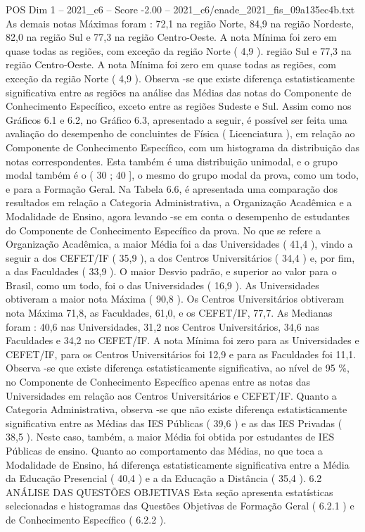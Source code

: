 \begin{textsample}{POS Dim 1 – 2021\_c6 – Score -2.00 – 2021\_c6/enade\_2021\_fis\_09a135ec4b.txt}
As demais notas Máximas foram : 72,1 na região Norte, 84,9 na região Nordeste, 82,0 na região Sul e 77,3 na região Centro-Oeste.
A nota Mínima foi zero em quase todas as regiões, com exceção da região Norte ( 4,9 ). região Sul e 77,3 na região Centro-Oeste.
A nota Mínima foi zero em quase todas as regiões, com exceção da região Norte ( 4,9 ).
Observa -se que existe diferença estatisticamente significativa entre as regiões na análise das Médias das notas do Componente de Conhecimento Específico, exceto entre as regiões Sudeste e Sul.
Assim como nos Gráficos 6.1 e 6.2, no Gráfico 6.3, apresentado a seguir, é possível ser feita uma avaliação do desempenho de concluintes de Física ( Licenciatura ), em relação ao Componente de Conhecimento Específico, com um histograma da distribuição das notas correspondentes.
Esta também é uma distribuição unimodal, e o grupo modal também é o ( 30 ; 40 ], o mesmo do grupo modal da prova, como um todo, e para a Formação Geral.
Na Tabela 6.6, é apresentada uma comparação dos resultados em relação a Categoria Administrativa, a Organização Acadêmica e a Modalidade de Ensino, agora levando -se em conta o desempenho de estudantes do Componente de Conhecimento Específico da prova.
No que se refere a Organização Acadêmica, a maior Média foi a das Universidades ( 41,4 ), vindo a seguir a dos CEFET/IF ( 35,9 ), a dos Centros Universitários ( 34,4 ) e, por fim, a das Faculdades ( 33,9 ).
O maior Desvio padrão, e superior ao valor para o Brasil, como um todo, foi o das Universidades ( 16,9 ).
As Universidades obtiveram a maior nota Máxima ( 90,8 ).
Os Centros Universitários obtiveram nota Máxima 71,8, as Faculdades, 61,0, e os CEFET/IF, 77,7.
As Medianas foram : 40,6 nas Universidades, 31,2 nos Centros Universitários, 34,6 nas Faculdades e 34,2 no CEFET/IF.
A nota Mínima foi zero para as Universidades e CEFET/IF, para os Centros Universitários foi 12,9 e para as Faculdades foi 11,1.
Observa -se que existe diferença estatisticamente significativa, ao nível de 95 \%, no Componente de Conhecimento Específico apenas entre as notas das Universidades em relação aos Centros Universitários e CEFET/IF.
Quanto a Categoria Administrativa, observa -se que não existe diferença estatisticamente significativa entre as Médias das IES Públicas ( 39,6 ) e as das IES Privadas ( 38,5 ).
Neste caso, também, a maior Média foi obtida por estudantes de IES Públicas de ensino.
Quanto ao comportamento das Médias, no que toca a Modalidade de Ensino, há diferença estatisticamente significativa entre a Média da Educação Presencial ( 40,4 ) e a da Educação a Distância ( 35,4 ). 6.2 ANÁLISE DAS QUESTÕES OBJETIVAS Esta seção apresenta estatísticas selecionadas e histogramas das Questões Objetivas de Formação Geral ( 6.2.1 ) e de Conhecimento Específico ( 6.2.2 ).

\end{textsample}
